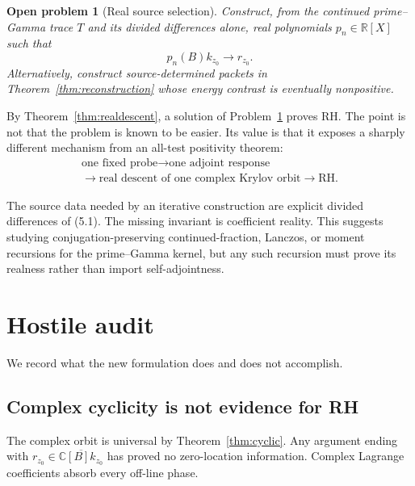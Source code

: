 \documentclass[11pt]{article}
\newtheorem{problem}[theorem]{Open problem}
\theoremstyle{definition}
\theoremstyle{remark}
\newcommand{\C}{\mathbb C}
\newcommand{\R}{\mathbb R}
\begin{document}
\begin{problem}[Real source selection]
\label{prob:real}
Construct, from the continued prime--Gamma trace $T$ and its divided differences alone, real
polynomials $p_n\in\R[X]$ such that
\begin{equation}
 p_n(B)k_{z_0}\longrightarrow r_{z_0}.                   \tag{6.1}
\end{equation}
Alternatively, construct source-determined packets in Theorem~\ref{thm:reconstruction} whose
energy contrast is eventually nonpositive.
\end{problem}

By Theorem~\ref{thm:realdescent}, a solution of Problem~\ref{prob:real} proves RH.  The point is
not that the problem is known to be easier.  Its value is that it exposes a sharply different
mechanism from an all-test positivity theorem:
\begin{equation}
 \boxed{
 \begin{gathered}
 \text{one fixed probe}\longrightarrow\text{one adjoint response}\\
 \longrightarrow\text{real descent of one complex Krylov orbit}
 \longrightarrow\mathrm{RH}.
 \end{gathered}}                                         \tag{6.2}
\end{equation}

The source data needed by an iterative construction are explicit divided differences of (5.1).
The missing invariant is coefficient reality.  This suggests studying conjugation-preserving
continued-fraction, Lanczos, or moment recursions for the prime--Gamma kernel, but any such
recursion must prove its realness rather than import self-adjointness.

\section{Hostile audit}

We record what the new formulation does and does not accomplish.

\subsection*{Complex cyclicity is not evidence for RH}
The complex orbit is universal by Theorem~\ref{thm:cyclic}.  Any argument ending with
$r_{z_0}\in\overline{\C[B]k_{z_0}}$ has proved no zero-location information.  Complex Lagrange
coefficients absorb every off-line phase.
\end{document}
